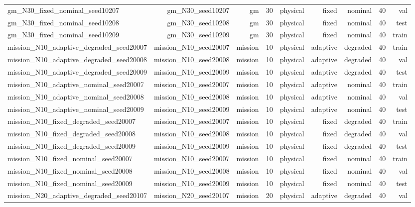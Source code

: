 \begin{tabular}{lrrrrrrrr}
gm\_N30\_fixed\_nominal\_seed10207 & gm\_N30\_seed10207 & gm & 30 & physical & fixed & nominal & 40 & val \\
gm\_N30\_fixed\_nominal\_seed10208 & gm\_N30\_seed10208 & gm & 30 & physical & fixed & nominal & 40 & test \\
gm\_N30\_fixed\_nominal\_seed10209 & gm\_N30\_seed10209 & gm & 30 & physical & fixed & nominal & 40 & train \\
mission\_N10\_adaptive\_degraded\_seed20007 & mission\_N10\_seed20007 & mission & 10 & physical & adaptive & degraded & 40 & train \\
mission\_N10\_adaptive\_degraded\_seed20008 & mission\_N10\_seed20008 & mission & 10 & physical & adaptive & degraded & 40 & val \\
mission\_N10\_adaptive\_degraded\_seed20009 & mission\_N10\_seed20009 & mission & 10 & physical & adaptive & degraded & 40 & test \\
mission\_N10\_adaptive\_nominal\_seed20007 & mission\_N10\_seed20007 & mission & 10 & physical & adaptive & nominal & 40 & train \\
mission\_N10\_adaptive\_nominal\_seed20008 & mission\_N10\_seed20008 & mission & 10 & physical & adaptive & nominal & 40 & val \\
mission\_N10\_adaptive\_nominal\_seed20009 & mission\_N10\_seed20009 & mission & 10 & physical & adaptive & nominal & 40 & test \\
mission\_N10\_fixed\_degraded\_seed20007 & mission\_N10\_seed20007 & mission & 10 & physical & fixed & degraded & 40 & train \\
mission\_N10\_fixed\_degraded\_seed20008 & mission\_N10\_seed20008 & mission & 10 & physical & fixed & degraded & 40 & val \\
mission\_N10\_fixed\_degraded\_seed20009 & mission\_N10\_seed20009 & mission & 10 & physical & fixed & degraded & 40 & test \\
mission\_N10\_fixed\_nominal\_seed20007 & mission\_N10\_seed20007 & mission & 10 & physical & fixed & nominal & 40 & train \\
mission\_N10\_fixed\_nominal\_seed20008 & mission\_N10\_seed20008 & mission & 10 & physical & fixed & nominal & 40 & val \\
mission\_N10\_fixed\_nominal\_seed20009 & mission\_N10\_seed20009 & mission & 10 & physical & fixed & nominal & 40 & test \\
mission\_N20\_adaptive\_degraded\_seed20107 & mission\_N20\_seed20107 & mission & 20 & physical & adaptive & degraded & 40 & val \\

\end{tabular}
